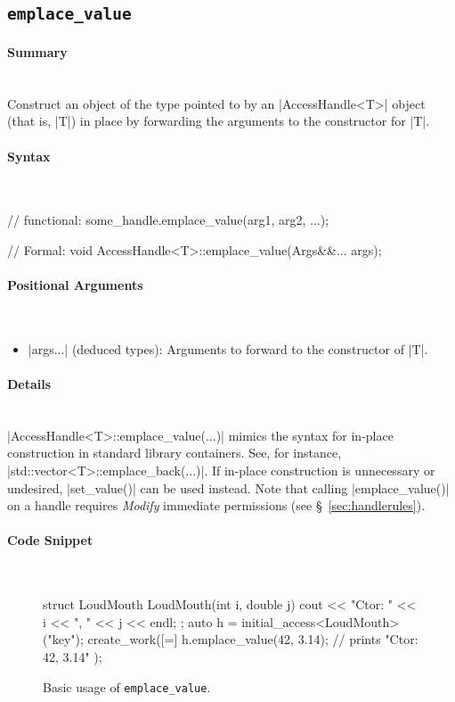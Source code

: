 \subsection{\texttt{emplace\_value}}
\label{ssec:api_fe_emplace_value}

\paragraph{Summary}\mbox{}\\ 
Construct an object of the type pointed to by an |AccessHandle<T>| object
(that is, |T|) in place by forwarding the arguments to the constructor
for |T|.

\paragraph{Syntax}\mbox{}\\ 
\begin{CppCode}
// functional:
some_handle.emplace_value(arg1, arg2, ...);

// Formal:
void AccessHandle<T>::emplace_value(Args&&... args);
\end{CppCode}

\paragraph{Positional Arguments}\mbox{}\\ 
\begin{itemize}
  \item |args...| (deduced types):  Arguments to forward to the
  constructor of |T|.
\end{itemize}

\paragraph{Details}\mbox{}\\ 

|AccessHandle<T>::emplace_value(...)| mimics the syntax for in-place
construction in standard library containers.  See, for instance,
|std::vector<T>::emplace_back(...)|.  If in-place construction is
unnecessary or undesired, |set_value()| can be used instead.  
Note that
calling |emplace_value()| on a handle requires {\it Modify} immediate
permissions (see \S~\ref{sec:handlerules}).

\paragraph{Code Snippet}\mbox{}\\ 
\begin{figure}[!h]
\begin{CppCodeNumb}
struct LoudMouth {
  LoudMouth(int i, double j) { cout << "Ctor: " << i << ", " << j << endl; }
};
auto h = initial_access<LoudMouth>("key");
create_work([=]{
  h.emplace_value(42, 3.14); // prints "Ctor: 42, 3.14" 
});
\end{CppCodeNumb}
\label{fig:fe_api_initialaccess}
\caption{Basic usage of \lstinline|emplace_value|.}
\end{figure}

